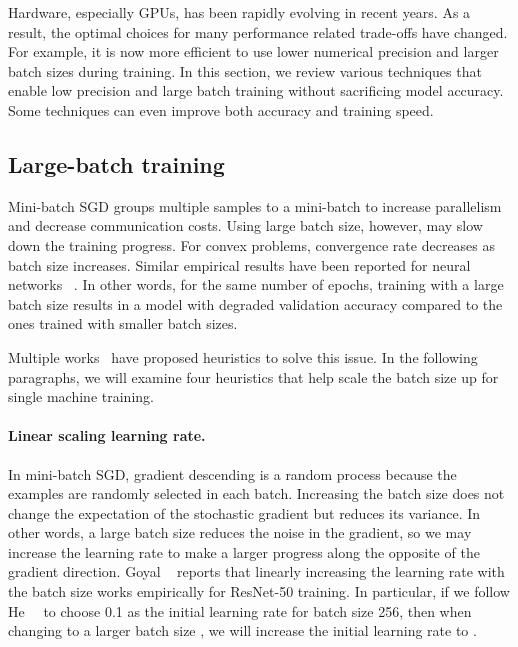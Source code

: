 \documentclass[10pt,twocolumn,letterpaper]{article}
\begin{document}
Hardware, especially GPUs, has been rapidly evolving in recent years.
As a result, the optimal choices for many performance related trade-offs have changed.
For example, it is now more efficient to use lower numerical precision and larger batch sizes during training.
In this section, we review various techniques that enable low precision and large batch training without sacrificing model accuracy.
Some techniques can even improve both accuracy and training speed.



\subsection{Large-batch training}
\label{sec:large-batch-training}




Mini-batch SGD groups multiple samples to a mini-batch to increase parallelism and decrease communication costs.
Using large batch size, however, may slow down the training progress.
For convex problems, convergence rate decreases as batch size increases. Similar empirical results have been reported for neural networks ~\cite{smith2017don}. In other words, for the same number of epochs, training with a large batch size results in a model with degraded validation accuracy compared to the ones trained with smaller batch sizes.

Multiple works~\cite{DBLP:journals/corr/GoyalDGNWKTJH17, jia2018highly} have proposed heuristics to solve this issue. In the following paragraphs, we will examine four heuristics that help scale the batch size up for single machine training.

\paragraph{Linear scaling learning rate.} In mini-batch SGD,  gradient descending is a random process because the examples are randomly selected in each batch. Increasing the batch size does not change the expectation of the stochastic gradient but reduces its variance.  In other words, a large batch size reduces the noise in the gradient, so we may increase the learning rate to make a larger progress along the opposite of the gradient direction. Goyal \etal~\cite{DBLP:journals/corr/GoyalDGNWKTJH17} reports that linearly increasing the learning rate with the batch size works empirically for ResNet-50 training. In particular, if we follow He~\etal~\cite{he2016deep} to choose 0.1 as the initial learning rate for batch size 256, then when changing to a larger batch size , we will increase the initial learning rate to .
\end{document}
